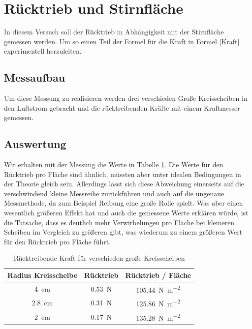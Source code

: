 \section{Rücktrieb und Stirnfläche}

In diesem Versuch soll der Rücktrieb in Abhängigkeit mit der Stirnfläche gemessen werden. Um so einen Teil der Formel für die Kraft in Formel \ref{Kraft} experimentell herzuleiten.

\subsection{Messaufbau}

Um diese Messung zu realisieren werden drei verschieden Große Kreisscheiben in den Luftstrom gebracht und die rücktreibenden Kräfte mit einem Kraftmesser gemessen.

\subsection{Auswertung}

Wir erhalten mit der Messung die Werte in Tabelle \ref{tab:Aufgabe2.1}. Die Werte für den Rücktrieb pro Fläche sind ähnlich, müssten aber unter idealen Bedingungen in der Theorie gleich sein. Allerdings lässt sich diese Abweichung einerseits auf die verschwindend kleine Messreihe zurückführen und auch auf die ungenaue Messmethode, da zum Beispiel Reibung eine große Rolle spielt. Was aber einen wesentlich größeren Effekt hat und auch die gemessene Werte erklären würde, ist die Tatsache, dass es deutlich mehr Verwirbelungen pro Fläche bei kleineren Scheiben im Vergleich zu größeren gibt, was wiederum zu einem größeren Wert für den Rücktrieb pro Fläche führt.

\begin{table}[h!]
    \caption{Rücktreibende Kraft für verschieden große Kreisscheiben}
    \centering
    \begin{tabular}{c c c}
    \hline
    Radius Kreisscheibe     & Rücktrieb  & Rücktrieb / Fläche\\
    \hline
    \SI{4}{\centi\metre}     & \SI{0.53}{\newton} & \SI{105.44}{\newton\per\square\metre}\\[5pt]
    \SI{2.8}{\centi\metre}  &   \SI{0.31}{\newton} & \SI{125.86}{\newton\per\square\metre} \\[5pt]
    \SI{2}{\centi\metre}    &   \SI{0.17}{\newton} & \SI{135.28}{\newton\per\square\metre} \\[5pt]
    \hline
    \end{tabular}
    \label{tab:Aufgabe2.1}
\end{table}

